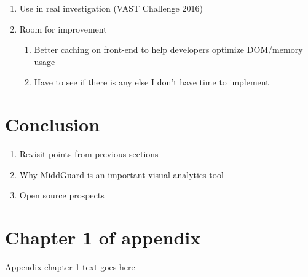 \documentclass[midd]{thesis}
\begin{document}
\begin{enumerate}
  \item Use in real investigation (VAST Challenge 2016)
  \item Room for improvement
  \begin{enumerate}
    \item Better caching on front-end to help developers optimize DOM/memory
    usage
    \item Have to see if there is any else I don't have time to implement
  \end{enumerate}
\end{enumerate}

\chapter{Conclusion}
  \begin{enumerate}
    \item Revisit points from previous sections
    \item Why MiddGuard is an important visual analytics tool
    \item Open source prospects
  \end{enumerate}

\appendix
\chapter{Chapter 1 of appendix}
Appendix chapter 1 text goes here


\end{document}
